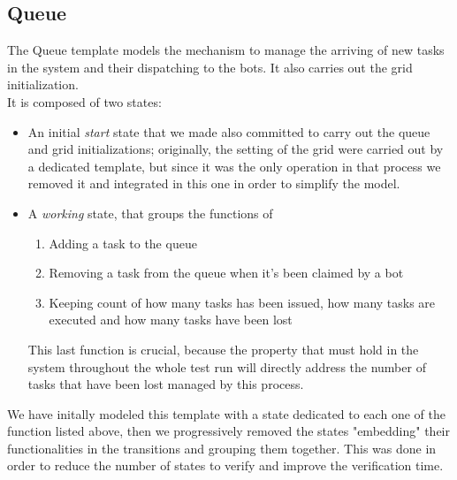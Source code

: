 \documentclass[10pt,a4paper]{article}
\begin{document}
		\subsection{Queue}
			The Queue template models the mechanism to manage the arriving of new tasks in the system and their dispatching to the bots. It also carries out the grid initialization.\\
			It is composed of two states:
			\begin{itemize}
				\item An initial \emph{start} state that we made also committed to carry out the queue and grid initializations; originally, the setting of the grid were carried out by a dedicated template, but since it was the only operation in that process we removed it and integrated in this one in order to simplify the model.
				\item A \emph{working} state, that groups the functions of
					\begin{enumerate}
						\item Adding a task to the queue
						\item Removing a task from the queue when it's been claimed by a bot
						\item Keeping count of how many tasks has been issued, how many tasks are executed and how many tasks have been lost
					\end{enumerate}
					This last function is crucial, because the property that must hold in the system throughout the whole test run will directly address the number of tasks that have been lost managed by this process.
			\end{itemize}
			We have initally modeled this template with a state dedicated to each one of the function listed above, then we progressively removed the states "embedding" their functionalities in the transitions and grouping them together. This was done in order to reduce the number of states to verify and improve the verification time. 
		
\end{document}
